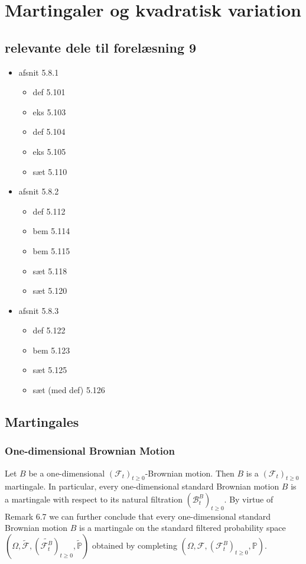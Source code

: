 \documentclass{article}
\numberwithin{equation}{section}
\begin{document}
\newpage

\section{Martingaler og kvadratisk variation}

\subsection*{relevante dele til forelæsning 9}
\begin{itemize}
    \item afsnit 5.8.1
    \begin{itemize}
        \item def 5.101
        \item eks 5.103
        \item def 5.104
        \item eks 5.105
        \item sæt 5.110
    \end{itemize}
    \item afsnit 5.8.2
    \begin{itemize}
        \item def 5.112
        \item bem 5.114
        \item bem 5.115
        \item sæt 5.118
        \item sæt 5.120
    \end{itemize}
    \item afsnit 5.8.3
    \begin{itemize}
        \item def 5.122
        \item bem 5.123
        \item sæt 5.125
        \item sæt (med def) 5.126
    \end{itemize}
\end{itemize}

\subsection{Martingales}

\subsubsection{One-dimensional Brownian Motion}
Let $B$ be a one-dimensional $(\mathcal{F}_t)_{t\geq 0}$-Brownian motion.
Then $B$ is a $(\mathcal{F}_t)_{t\geq 0}$ martingale.
In particular, every one-dimensional standard Brownian motion $B$ is a martingale with respect to its natural filtration $(\mathcal{B}_t^B)_{t\geq 0}$.
By virtue of Remark 6.7 we can further conclude that every one-dimensional standard Brownian motion $B$ is a martingale on the standard filtered probability space $(\Omega, \tilde{\mathcal{F}},(\tilde{\mathcal{F}_t^B})_{t\geq 0},\tilde{\mathbb{P}})$ obtained by completing $(\Omega, \mathcal{F},(\mathcal{F}_t^B)_{t\geq 0},\mathbb{P})$.
\end{document}
